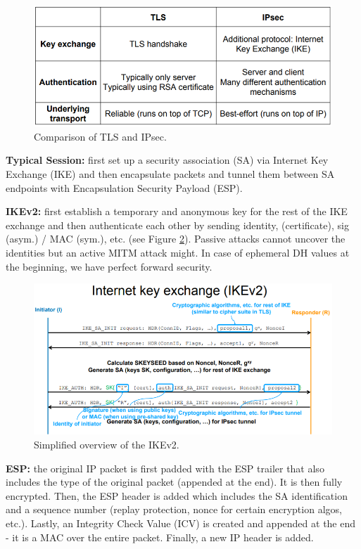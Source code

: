 \begin{figure}[h]
	\centering
	\includegraphics[scale=0.6]{images/5-ipsec_tls.PNG}
	\caption{Comparison of TLS and IPsec.}
	\label{fig:ipsec_tls}
\end{figure}

\textbf{Typical Session:} first set up a security association (SA) via Internet Key Exchange (IKE) and then encapsulate packets and tunnel them between SA endpoints with Encapsulation Security Payload (ESP).

\textbf{IKEv2:} first establish a temporary and anonymous key for the rest of the IKE exchange and then authenticate each other by sending identity, (certificate), sig (asym.) / MAC (sym.), etc. (see Figure \ref{fig:ike}). Passive attacks cannot uncover the identities but an active MITM attack might. In case of ephemeral DH values at the beginning, we have perfect forward security. %

\begin{figure}[h]
	\centering
	\includegraphics[scale=0.7]{images/5-ike.PNG}
	\caption{Simplified overview of the IKEv2.}
	\label{fig:ike}
\end{figure}

\textbf{ESP:} the original IP packet is first padded with the ESP trailer that also includes the type of the original packet (appended at the end). It is then fully encrypted. Then, the ESP header is added which includes the SA identification and a sequence number (replay protection, nonce for certain encryption algos, etc.). Lastly, an Integrity Check Value (ICV) is created and appended at the end - it is a MAC over the entire packet. Finally, a new IP header is added.

